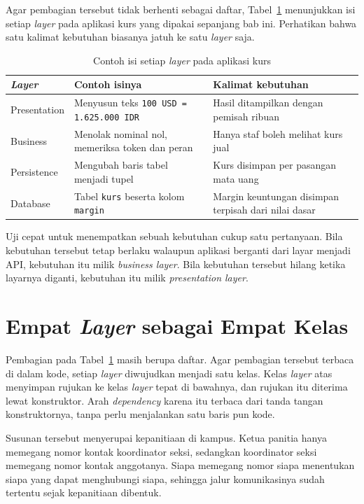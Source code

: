 Agar pembagian tersebut tidak berhenti sebagai daftar, Tabel~\ref{tab:contoh-lapisan}
menunjukkan isi setiap \textit{layer} pada aplikasi kurs yang dipakai sepanjang bab
ini. Perhatikan bahwa satu kalimat kebutuhan biasanya jatuh ke satu \textit{layer}
saja.

\begin{table}[htbp]
  \centering
  \caption{Contoh isi setiap \textit{layer} pada aplikasi kurs}
  \label{tab:contoh-lapisan}
  \begin{tabularx}{\textwidth}{|l|X|X|}
    \hline
    \textbf{\textit{Layer}} & \textbf{Contoh isinya} & \textbf{Kalimat kebutuhan} \\
    \hline
    Presentation & Menyusun teks \texttt{100 USD = 1.625.000 IDR} & Hasil ditampilkan dengan pemisah ribuan \\
    \hline
    Business & Menolak nominal nol, memeriksa token dan peran & Hanya staf boleh melihat kurs jual \\
    \hline
    Persistence & Mengubah baris tabel menjadi tupel & Kurs disimpan per pasangan mata uang \\
    \hline
    Database & Tabel \texttt{kurs} beserta kolom \texttt{margin} & Margin keuntungan disimpan terpisah dari nilai dasar \\
    \hline
  \end{tabularx}
\end{table}

Uji cepat untuk menempatkan sebuah kebutuhan cukup satu pertanyaan. Bila
kebutuhan tersebut tetap berlaku walaupun aplikasi berganti dari layar menjadi
API, kebutuhan itu milik \textit{business layer}. Bila kebutuhan tersebut hilang ketika
layarnya diganti, kebutuhan itu milik \textit{presentation layer}.

\section{Empat \textit{Layer} sebagai Empat Kelas}

Pembagian pada Tabel~\ref{tab:contoh-lapisan} masih berupa daftar. Agar
pembagian tersebut terbaca di dalam kode, setiap \textit{layer} diwujudkan menjadi
satu kelas. Kelas \textit{layer} atas menyimpan rujukan ke kelas \textit{layer} tepat di
bawahnya, dan rujukan itu diterima lewat konstruktor. Arah \textit{dependency}
karena itu terbaca dari tanda tangan konstruktornya, tanpa perlu menjalankan
satu baris pun kode.

Susunan tersebut menyerupai kepanitiaan di kampus. Ketua panitia hanya memegang
nomor kontak koordinator seksi, sedangkan koordinator seksi memegang nomor
kontak anggotanya. Siapa memegang nomor siapa menentukan siapa yang dapat
menghubungi siapa, sehingga jalur komunikasinya sudah tertentu sejak
kepanitiaan dibentuk.


